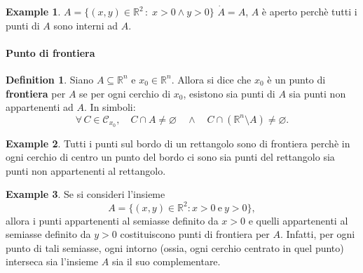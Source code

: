 \documentclass{article}
\theoremstyle{plain}
\theoremstyle{definition}
\newtheorem{defn}{Definition}[section]
\newtheorem{exmp}{Example}[section]
\theoremstyle{remark}
\begin{document}
\vspace{10pt}

\begin{exmp}
    $A=\{(x,y)\in\mathbb{R}^2\,:\; x>0\land y>0\}$
    $\dot{A}=A$, $A$ è aperto perchè tutti i punti di $A$ sono interni ad $A$.
\end{exmp}

\vspace{10pt}

\paragraph{Punto di frontiera}
\begin{bxthm}
\begin{defn}
    Siano $A\subseteq\mathbb{R}^n$ e $x_0\in\mathbb{R}^n$.
    Allora si dice che $x_0$ è un punto di \textbf{frontiera} per $A$ se per ogni cerchio di $x_0$, esistono sia punti di $A$ sia punti non appartenenti ad $A$.
    In simboli:
    \[
    \forall\, C\in\mathcal{C}_{x_0},\quad C\cap A\neq\varnothing \quad \land \quad C\cap (\mathbb{R}^n\setminus A)\neq\varnothing.
    \]
\end{defn}
\end{bxthm}

\vspace{10pt}

\begin{exmp}
    Tutti i punti sul bordo di un rettangolo sono di frontiera perchè in ogni cerchio di centro un punto del bordo ci sono sia punti del rettangolo sia punti non appartenenti al rettangolo.
\end{exmp}

\vspace{10pt}

\begin{exmp}
    Se si consideri l'insieme 
    \[ A=\{(x,y)\in\mathbb{R}^2 : x>0 \ \text{e} \ y>0\}, \]
    allora i punti appartenenti al semiasse definito da \(x>0\) e quelli appartenenti al semiasse definito da \(y>0\) costituiscono punti di frontiera per \(A\). 
    Infatti, per ogni punto di tali semiasse, ogni intorno (ossia, ogni cerchio centrato in quel punto) interseca sia l'insieme \(A\) sia il suo complementare.
\end{exmp}

\vspace{10pt}
\end{document}
